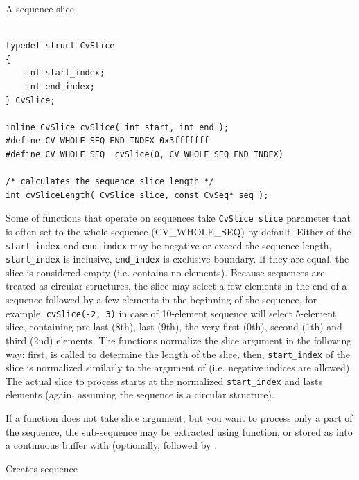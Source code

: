 \label{CvSlice}

A sequence slice

\begin{lstlisting}

typedef struct CvSlice
{
    int start_index;
    int end_index;
} CvSlice;

inline CvSlice cvSlice( int start, int end );
#define CV_WHOLE_SEQ_END_INDEX 0x3fffffff
#define CV_WHOLE_SEQ  cvSlice(0, CV_WHOLE_SEQ_END_INDEX)

/* calculates the sequence slice length */
int cvSliceLength( CvSlice slice, const CvSeq* seq );

\end{lstlisting}

Some of functions that operate on sequences take \texttt{CvSlice slice}
parameter that is often set to the whole sequence (CV\_WHOLE\_SEQ) by
default. Either of the \texttt{start\_index} and \texttt{end\_index}
may be negative or exceed the sequence length, \texttt{start\_index} is
inclusive, \texttt{end\_index} is exclusive boundary. If they are equal,
the slice is considered empty (i.e. contains no elements). Because
sequences are treated as circular structures, the slice may select a
few elements in the end of a sequence followed by a few elements in the
beginning of the sequence, for example, \texttt{cvSlice(-2, 3)} in case of
10-element sequence will select 5-element slice, containing pre-last
(8th), last (9th), the very first (0th), second (1th) and third (2nd)
elements. The functions normalize the slice argument in the following way:
first,  is called to determine the length of the slice,
then, \texttt{start\_index} of the slice is normalized similarly to the
argument of  (i.e. negative indices are allowed). The
actual slice to process starts at the normalized \texttt{start\_index}
and lasts  elements (again, assuming the sequence is
a circular structure).

If a function does not take slice argument, but you want to process
only a part of the sequence, the sub-sequence may be extracted
using  function, or stored as into a continuous
buffer with  (optionally, followed by
.

\label{CreateSeq}

Creates sequence


